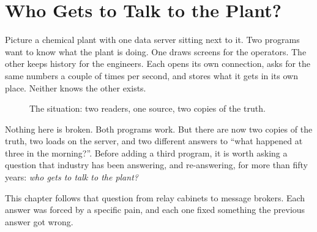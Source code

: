 \chapter{Who Gets to Talk to the Plant?}

Picture a chemical plant with one data server sitting next to it. Two programs
want to know what the plant is doing. One draws screens for the operators. The
other keeps history for the engineers. Each opens its own connection, asks for
the same numbers a couple of times per second, and stores what it gets in its
own place. Neither knows the other exists.

\begin{figure}[htbp]
\centering
{}
\caption{The situation: two readers, one source, two copies of the truth.}
\end{figure}

Nothing here is broken. Both programs work. But there are now two copies of the
truth, two loads on the server, and two different answers to ``what happened at
three in the morning?''. Before adding a third program, it is worth asking a
question that industry has been answering, and re-answering, for more than fifty
years: \emph{who gets to talk to the plant?}

This chapter follows that question from relay cabinets to message brokers. Each
answer was forced by a specific pain, and each one fixed something the previous
answer got wrong.


